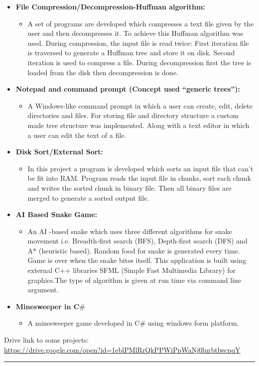 \documentclass[9pt,a4paper]{article}
\newcommand{\MyHorizontalLine}{\noindent\rule{\linewidth}{1.5pt}\\}
\begin{document}
\begin{itemize}
		\item \textbf{File Compression/Decompression-Huffman algorithm:}
		\begin{itemize}
			\item[]A set of programs are developed which compresses a text file given by the user and then decompresses it. To achieve this Huffman algorithm was used. During compression, the input file is read twice: First iteration file is traversed to generate a Huffman tree and store it on disk. Second iteration is used to compress a file. During decompression first the tree is loaded from the disk then decompression is done.
		\end{itemize}
		
		\item \textbf{Notepad and command prompt (Concept used “generic trees”):}
		\begin{itemize}
			\item[]A Windows-like command prompt in which a user can create, edit, delete directories and files. For storing file and directory structure a custom made tree structure was implemented. Along with a text editor in which a user can edit the text of a file.
		\end{itemize}
		
		\item \textbf{Disk Sort/External Sort:}
		\begin{itemize}
			\item[]In this project a program is developed which sorts an input file that can’t be fit into
			RAM. Program reads the input file in chunks, sort each chunk and writes the sorted chunk in binary file. Then all binary files are merged to generate a sorted output file.
		\end{itemize}
		
		\item \textbf{AI Based Snake Game:}
		\begin{itemize}
			\item[]An AI -based snake which uses three different algorithms for snake movement i.e. Breadth-first search (BFS), Depth-first search (DFS) and A* (heuristic based). Random food for snake is generated every time. Game is over when the snake bites itself. This application is built using external C++ libraries SFML (Simple Fast Multimedia Library) for graphics.The type of algorithm is given at run time via command line argument.
		\end{itemize}
		
		\item \textbf{Minesweeper in C$\#$}
		\begin{itemize}
			\item[]A minesweeper game developed in C$\#$ using windows form platform.
		\end{itemize}
	\end{itemize}
	Drive link to some projects:\\
	\url{https://drive.google.com/open?id=1eblPMlRrQkPPWiPpWaNj0lurbtlwcpqY}
	\MyHorizontalLine
\end{document}
